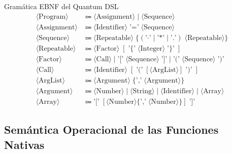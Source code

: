 \documentclass[11pt,a4paper]{article}
\begin{document}
\begin{mathdefbox}{Gramática EBNF del Quantum DSL}
\begin{align*}
\langle \text{Program} \rangle &\Coloneqq \langle \text{Assignment} \rangle \mid \langle \text{Sequence} \rangle \\
\langle \text{Assignment} \rangle &\Coloneqq \langle \text{Identifier} \rangle \; \text{'='} \; \langle \text{Sequence} \rangle \\
\langle \text{Sequence} \rangle &\Coloneqq \langle \text{Repeatable} \rangle \; \{ (\text{'·'} \mid \text{'*'} \mid \text{'.'}) \; \langle \text{Repeatable} \rangle \} \\
\langle \text{Repeatable} \rangle &\Coloneqq \langle \text{Factor} \rangle \; [ \; \text{'\{'} \; \langle \text{Integer} \rangle \; \text{'\}'} \; ] \\
\langle \text{Factor} \rangle &\Coloneqq \langle \text{Call} \rangle \mid \text{'['} \; \langle \text{Sequence} \rangle \; \text{']'} \mid \text{'('} \; \langle \text{Sequence} \rangle \; \text{')'} \\
\langle \text{Call} \rangle &\Coloneqq \langle \text{Identifier} \rangle \; [ \; \text{'('} \; [ \langle \text{ArgList} \rangle ] \; \text{')'} \; ] \\
\langle \text{ArgList} \rangle &\Coloneqq \langle \text{Argument} \rangle \; \{ \text{','} \; \langle \text{Argument} \rangle \} \\
\langle \text{Argument} \rangle &\Coloneqq \langle \text{Number} \rangle \mid \langle \text{String} \rangle \mid \langle \text{Identifier} \rangle \mid \langle \text{Array} \rangle \\
\langle \text{Array} \rangle &\Coloneqq \text{'['} \; [ \langle \text{Number} \rangle \{ \text{','} \; \langle \text{Number} \rangle \} ] \; \text{']'}
\end{align*}
\end{mathdefbox}

\subsection{Semántica Operacional de las Funciones Nativas}
\end{document}
